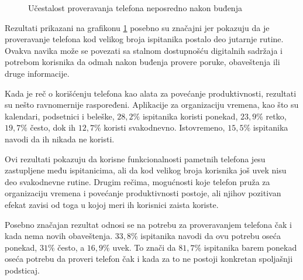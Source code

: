 \documentclass{article}
\begin{document}
\begin{figure}[ht]
\centering
{}
\caption{Učestalost proveravanja telefona neposredno nakon buđenja}
\label{fig:telefon-budjenje}
\end{figure}

Rezultati prikazani na grafikonu \ref{fig:telefon-budjenje} posebno su značajni jer pokazuju da je proveravanje telefona kod velikog broja ispitanika postalo deo jutarnje rutine. Ovakva navika može se povezati sa stalnom dostupnošću digitalnih sadržaja i potrebom korisnika da odmah nakon buđenja provere poruke, obaveštenja ili druge informacije.

Kada je reč o korišćenju telefona kao alata za povećanje produktivnosti, rezultati su nešto ravnomernije raspoređeni. Aplikacije za organizaciju vremena, kao što su kalendari, podsetnici i beleške, $28{,}2\%$ ispitanika koristi ponekad, $23{,}9\%$ retko, $19{,}7\%$ često, dok ih $12{,}7\%$ koristi svakodnevno. Istovremeno, $15{,}5\%$ ispitanika navodi da ih nikada ne koristi.

Ovi rezultati pokazuju da korisne funkcionalnosti pametnih telefona jesu zastupljene među ispitanicima, ali da kod velikog broja korisnika još uvek nisu deo svakodnevne rutine. Drugim rečima, mogućnosti koje telefon pruža za organizaciju vremena i povećanje produktivnosti postoje, ali njihov pozitivan efekat zavisi od toga u kojoj meri ih korisnici zaista koriste.

Posebno značajan rezultat odnosi se na potrebu za proveravanjem telefona čak i kada nema novih obaveštenja. $33{,}8\%$ ispitanika navodi da ovu potrebu oseća ponekad, $31\%$ često, a $16{,}9\%$ uvek. To znači da $81{,}7\%$ ispitanika barem ponekad oseća potrebu da proveri telefon čak i kada za to ne postoji konkretan spoljašnji podsticaj.
\end{document}
